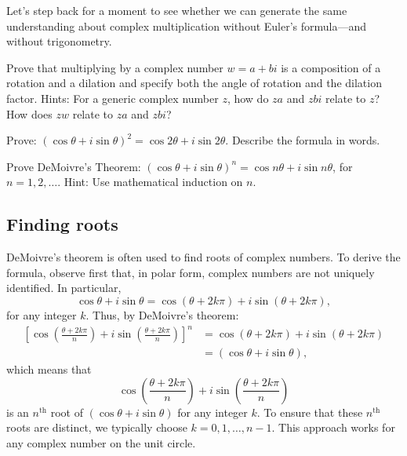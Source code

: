 \documentclass[space,nooutcomes]{ximera}
\begin{document}
%
%
Let's step back for a moment to see whether we can generate the same understanding about complex multiplication without Euler's formula---and without trigonometry.  
\begin{problem}
Prove that multiplying by a complex number $w = a + bi$ is a composition of a rotation and a dilation and specify both the angle of rotation and the dilation factor.  Hints: For a generic complex number $z$, how do $za$ and $zbi$ relate to $z$?  How does $zw$ relate to $za$ and $zbi$?  
\end{problem}

\begin{problem}
Prove:  $(\cos\theta + i\sin\theta)^2=\cos 2\theta + i\sin 2\theta$.  Describe the formula in words.    
\end{problem}

\begin{problem}
Prove DeMoivre's Theorem:  $(\cos\theta + i\sin\theta)^n=\cos n\theta + i\sin n\theta$, for $n=1, 2, \dots$.  Hint: Use mathematical induction on $n$. 
\end{problem}

\subsection{Finding roots}
DeMoivre's theorem is often used to find roots of complex numbers.  
To derive the formula, observe first that, in polar form, complex numbers are not uniquely identified.  In particular, 
\[
\cos\theta + i\sin\theta =\cos (\theta+2k\pi) + i\sin (\theta+2k\pi), 
\]
for any integer $k$. Thus, by DeMoivre's theorem:  
\begin{align*}
\left[ \cos \left(\frac{\theta+2k\pi}{n}\right) 
+ i\sin \left(\frac{\theta+2k\pi}{n}\right) \right]^n 
&= \cos (\theta+2k\pi) + i\sin (\theta+2k\pi) \\
&= (\cos\theta + i\sin\theta), 
\end{align*}
which means that 
\[
\cos \left(\frac{\theta+2k\pi}{n}\right) 
+ i\sin \left(\frac{\theta+2k\pi}{n}\right)
\]
is an $n^\text{th}$ root of $(\cos\theta + i\sin\theta)$ for any integer $k$.  To ensure that these $n^\text{th}$ roots are distinct, we typically choose $k= 0, 1, \dots, n-1$.  This approach works for any complex number on the unit circle.  
\end{document}
